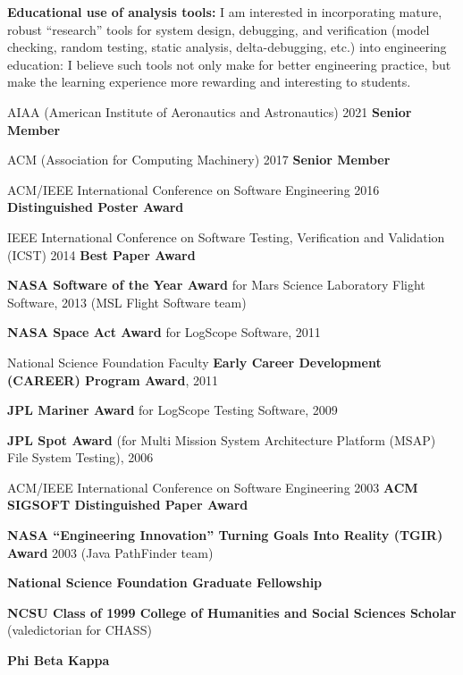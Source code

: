 \documentclass[ComputerScience]{vita}
\newcommand{\comment}[1]{}
\begin{document}
\begin{vita}
\begin{Research Interests}
\begin{Topics}
\item{\bf Educational use of analysis tools:}  I am interested in incorporating mature, robust ``research'' tools for system design, debugging, and verification (model checking, random testing, static analysis, delta-debugging, etc.) into engineering education:  I believe such tools not only make for better engineering practice, but make the learning experience more rewarding and interesting to students.
\comment{
\item {\bf Coverage for model checking:} I am interested in coverage metrics and certification methods for model checkers.  Traditional and cutting-edge measures from the world of testing can be applied to model checking runs, and proof-based techniques for certification have recently appeared.  However, the general problem remains:  after verification, how much confidence should we have in in the correctness of a program?}
\end{Topics}
\end{Research Interests}


\begin{Honors}
\item AIAA (American Institute of Aeronautics and Astronautics) 2021 {\bf Senior Member}
\item ACM (Association for Computing Machinery) 2017 {\bf Senior Member}
\item ACM/IEEE International Conference on Software Engineering 2016 {\bf Distinguished Poster Award}
  \item IEEE International Conference on Software Testing, Verification and Validation (ICST) 2014 {\bf Best Paper Award}
  \item {\bf NASA Software of the Year Award} for Mars Science Laboratory Flight Software, 2013 (MSL Flight Software team)
  \item {\bf NASA Space Act Award} for LogScope Software, 2011
  \item National Science Foundation Faculty {\bf Early Career Development (CAREER) Program Award}, 2011
  \item {\bf JPL Mariner Award} for LogScope Testing Software, 2009
  \item {\bf JPL Spot Award} (for Multi Mission System Architecture Platform
  (MSAP) File System Testing), 2006 \item ACM/IEEE International Conference on Software Engineering 2003 {\bf ACM SIGSOFT
  Distinguished Paper Award} \item {\bf NASA ``Engineering Innovation''
  Turning Goals Into Reality (TGIR) Award} 2003 (Java PathFinder team)
  \item {\bf National Science Foundation Graduate Fellowship} \item {\bf NCSU
  Class of 1999 College of Humanities and Social Sciences Scholar}
  (valedictorian for CHASS) \item {\bf Phi Beta Kappa}
\end{Honors}



\end{vita}
\end{document}
